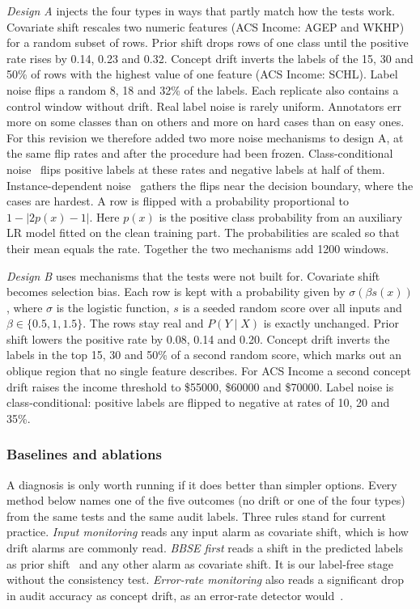 \documentclass[pdflatex,referee,lineno,sn-basic]{sn-jnl}
\begin{document}
\emph{Design A} injects the four types in ways that partly match how the tests work. Covariate shift rescales two numeric features (ACS Income: AGEP and WKHP) for a random subset of rows. Prior shift drops rows of one class until the positive rate rises by 0.14, 0.23 and 0.32. Concept drift inverts the labels of the 15, 30 and 50\% of rows with the highest value of one feature (ACS Income: SCHL). Label noise flips a random 8, 18 and 32\% of the labels. Each replicate also contains a control window without drift. Real label noise is rarely uniform. Annotators err more on some classes than on others and more on hard cases than on easy ones. For this revision we therefore added two more noise mechanisms to design A, at the same flip rates and after the procedure had been frozen. Class-conditional noise~\citep{natarajan2013noisy} flips positive labels at these rates and negative labels at half of them. Instance-dependent noise~\citep{chen2021instance} gathers the flips near the decision boundary, where the cases are hardest. A row is flipped with a probability proportional to $1-|2p(x)-1|$. Here $p(x)$ is the positive class probability from an auxiliary LR model fitted on the clean training part. The probabilities are scaled so that their mean equals the rate. Together the two mechanisms add 1200 windows.

\emph{Design B} uses mechanisms that the tests were not built for. Covariate shift becomes selection bias. Each row is kept with a probability given by $\sigma(\beta s(x))$, where $\sigma$ is the logistic function, $s$ is a seeded random score over all inputs and $\beta\in\{0.5, 1, 1.5\}$. The rows stay real and $P(Y\mid X)$ is exactly unchanged. Prior shift lowers the positive rate by 0.08, 0.14 and 0.20. Concept drift inverts the labels in the top 15, 30 and 50\% of a second random score, which marks out an oblique region that no single feature describes. For ACS Income a second concept drift raises the income threshold to \$55000, \$60000 and \$70000. Label noise is class-conditional: positive labels are flipped to negative at rates of 10, 20 and 35\%.

\subsubsection{Baselines and ablations}\label{sec:baselines}

A diagnosis is only worth running if it does better than simpler options. Every method below names one of the five outcomes (no drift or one of the four types) from the same tests and the same audit labels. Three rules stand for current practice. \emph{Input monitoring} reads any input alarm as covariate shift, which is how drift alarms are commonly read. \emph{BBSE first} reads a shift in the predicted labels as prior shift~\citep{lipton2018bbse,rabanser2019failing} and any other alarm as covariate shift. It is our label-free stage without the consistency test. \emph{Error-rate monitoring} also reads a significant drop in audit accuracy as concept drift, as an error-rate detector would~\citep{gama2004ddm}.
\end{document}
